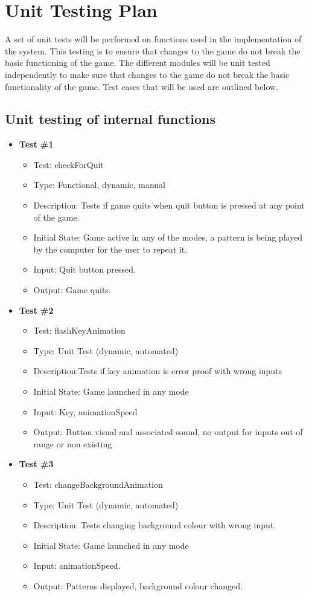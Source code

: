 \documentclass[12pt, titlepage]{article}
\begin{document}
\section{Unit Testing Plan}
A set of unit tests will be performed on functions used in the implementation of the system. This testing is to ensure that changes to the game do not break the basic functioning of the game. The different modules will be unit tested independently to make sure that changes to the game do not break the basic functionality of the game. Test cases that will be used are outlined below.

\subsection{Unit testing of internal functions}

\begin{itemize}
\item \textbf{Test \#1}
\begin{itemize}
\item Test: checkForQuit
\item Type: Functional, dynamic, manual		
\item Description: Tests if game quits when quit button is pressed at any point of the game.	
\item Initial State: Game active in any of the modes, a pattern is being played by the computer for the user to repeat it.
\item Input: Quit button pressed.
\item Output: Game quits.	
\end{itemize}

\item \textbf{Test \#2}
\begin{itemize}
\item Test: flashKeyAnimation
\item Type: Unit Test (dynamic, automated)			
\item Description:Tests if key animation is error proof with wrong inputs
\item Initial State: Game launched in any mode
\item Input: Key, animationSpeed
\item Output: Button visual and associated sound, no output for inputs out of range or non existing		
\end{itemize}

\item \textbf{Test \#3}
\begin{itemize}
\item Test: changeBackgroundAnimation
\item Type: Unit Test (dynamic, automated)			
\item Description: Tests changing background colour with wrong input.	
\item Initial State: Game launched in any mode
\item Input: animationSpeed.
\item Output: Patterns displayed, background colour changed.	
\end{itemize}


\end{itemize}
\end{document}
